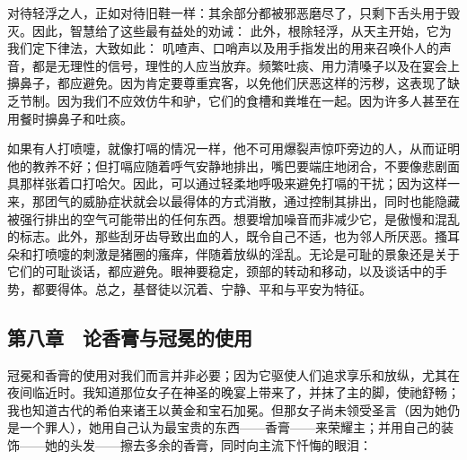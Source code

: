 \par

  对待轻浮之人，正如对待旧鞋一样：其余部分都被邪恶磨尽了，只剩下舌头用于毁灭。因此，智慧给了这些最有益处的劝诫： 此外，根除轻浮，从天主开始，它为我们定下律法，大致如此：  叽喳声、口哨声以及用手指发出的用来召唤仆人的声音，都是无理性的信号，理性的人应当放弃。频繁吐痰、用力清嗓子以及在宴会上擤鼻子，都应避免。因为肯定要尊重宾客，以免他们厌恶这样的污秽，这表现了缺乏节制。因为我们不应效仿牛和驴，它们的食槽和粪堆在一起。因为许多人甚至在用餐时擤鼻子和吐痰。\par

如果有人打喷嚏，就像打嗝的情况一样，他不可用爆裂声惊吓旁边的人，从而证明他的教养不好；但打嗝应随着呼气安静地排出，嘴巴要端庄地闭合，不要像悲剧面具那样张着口打哈欠。因此，可以通过轻柔地呼吸来避免打嗝的干扰；因为这样一来，那团气的威胁症状就会以最得体的方式消散，通过控制其排出，同时也能隐藏被强行排出的空气可能带出的任何东西。想要增加噪音而非减少它，是傲慢和混乱的标志。此外，那些刮牙齿导致出血的人，既令自己不适，也为邻人所厌恶。搔耳朵和打喷嚏的刺激是猪圈的瘙痒，伴随着放纵的淫乱。无论是可耻的景象还是关于它们的可耻谈话，都应避免。眼神要稳定，颈部的转动和移动，以及谈话中的手势，都要得体。总之，基督徒以沉着、宁静、平和与平安为特征。\par


\subsection{第八章　论香膏与冠冕的使用}

冠冕和香膏的使用对我们而言并非必要；因为它驱使人们追求享乐和放纵，尤其在夜间临近时。我知道那位女子在神圣的晚宴上带来了，并抹了主的脚，使祂舒畅；我也知道古代的希伯来诸王以黄金和宝石加冕。但那女子尚未领受圣言（因为她仍是一个罪人），她用自己认为最宝贵的东西——香膏——来荣耀主；并用自己的装饰——她的头发——擦去多余的香膏，同时向主流下忏悔的眼泪： \par

